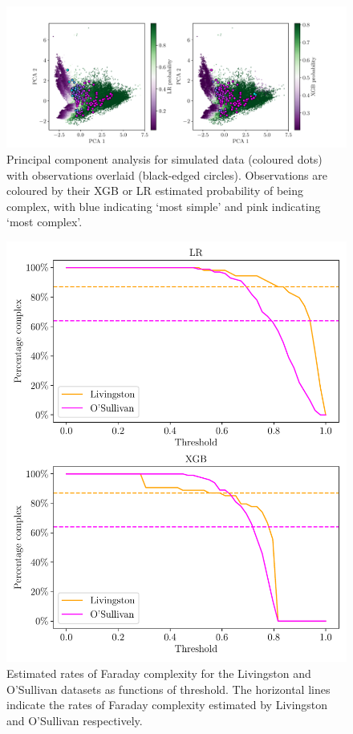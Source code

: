 \documentclass[11pt, a4paper]{book}
\begin{document}
    \begin{figure}
      \centering
      \includegraphics[width=\linewidth]{faraday-images/pca_with_overlay.pdf}
      \caption[Principal component analysis for simulated data with observations overlaid.]{Principal component analysis for simulated data (coloured dots) with observations overlaid (black-edged circles). Observations are coloured by their XGB or LR estimated probability of being complex, with blue indicating `most simple' and pink indicating `most complex'.}
      \label{fig:faraday-pca}
    \end{figure}
    \begin{figure}
      \centering
      \includegraphics[width=\linewidth]{faraday-images/pc_complex_curves.pdf}
      \caption[Estimated rates of Faraday complexity for the Livingston and O'Sullivan datasets as functions of threshold.]{Estimated rates of Faraday complexity for the Livingston and O'Sullivan datasets as functions of threshold. The horizontal lines indicate the rates of Faraday complexity estimated by Livingston and O'Sullivan respectively.}
      \label{fig:faraday-complexity-rates}
    \end{figure}
\end{document}
